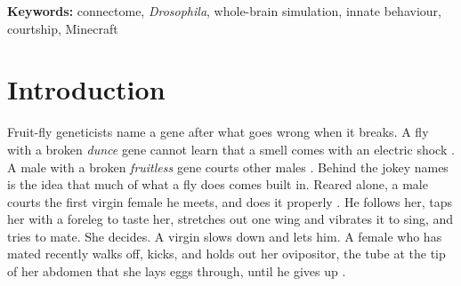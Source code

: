 
\maketitle

\begin{abstract}
\noindent I ask what the complete wiring diagram of a fruit fly's brain knows about meeting another fly. To find out, I run a published simulation of that diagram as the brain of a fly in Minecraft, first on its own, then with one internal state switched on, then with a learning rule. I try hard to break every result. Run this way, I argue, the wiring knows how to react but not what it wants. The senses send mostly ``no'' or nothing to the neurons that decide whether to accept a male or fight, but keeping the female's two ``virgin'' neurons firing wakes her acceptance neurons. Keeping hunger neurons firing does no more than keeping an unrelated group firing. A memory forms once I supply the teaching signal that the model's taste neurons fail to send, and the fly hardly ever uses it. Along the way I found that most smells leave the model firing on its own for as long as I watched, and that several things I first believed were wrong.
\end{abstract}

\medskip
\noindent\textbf{Keywords:} connectome, \emph{Drosophila}, whole-brain simulation, innate behaviour, courtship, Minecraft

\section{Introduction}
\label{sec:introduction}

Fruit-fly geneticists name a gene after what goes wrong when it breaks. A fly with a broken \emph{dunce} gene cannot learn that a smell comes with an electric shock \citep{dudai1976dunce}. A male with a broken \emph{fruitless} gene courts other males \citep{ryner1996control}. Behind the jokey names is the idea that much of what a fly does comes built in. Reared alone, a male courts the first virgin female he meets, and does it properly \citep{siegel1979conditioned}. He follows her, taps her with a foreleg to taste her, stretches out one wing and vibrates it to sing, and tries to mate. She decides. A virgin slows down and lets him. A female who has mated recently walks off, kicks, and holds out her ovipositor, the tube at the tip of her abdomen that she lays eggs through, until he gives up \citep{greenspan2000courtship}.

